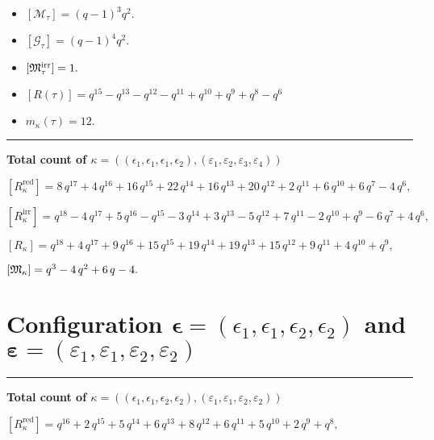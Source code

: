 \documentclass[10pt,a4paper]{amsart}
\begin{document}
\begin{itemize}
 \item $[\mathcal{M}_{\tau}] = {\left(q - 1\right)}^{3} q^{2} .$

 \item $[\mathcal{G}_{\tau}] = {\left(q - 1\right)}^{4} q^{2} .$

 \item $[{\frak M}_{\tau}^{\textrm{irr}}] = 1 .$

 \item $[R(\tau)] = q^{15} - q^{13} - q^{12} - q^{11} + q^{10} + q^{9} + q^{8} - q^{6} $

 \item $m_{\kappa}(\tau) = 12 .$

 \end{itemize}
\noindent\rule{9cm}{2pt}\vspace{0.2cm}

\noindent\textbf{Total count of $\kappa = ((\epsilon_1,\epsilon_1,\epsilon_1,\epsilon_2), (\varepsilon_1,\varepsilon_2,\varepsilon_3,\varepsilon_4))$}\medskip

${[R_{\kappa}^{\textrm{red}}]} = 8 \, q^{17} + 4 \, q^{16} + 16 \, q^{15} + 22 \, q^{14} + 16 \, q^{13} + 20 \, q^{12} + 2 \, q^{11} + 6 \, q^{10} + 6 \, q^{7} - 4 \, q^{6} ,$

${[R_{\kappa}^{\textrm{irr}}]} = q^{18} - 4 \, q^{17} + 5 \, q^{16} - q^{15} - 3 \, q^{14} + 3 \, q^{13} - 5 \, q^{12} + 7 \, q^{11} - 2 \, q^{10} + q^{9} - 6 \, q^{7} + 4 \, q^{6} ,$

${[R_{\kappa}]} = q^{18} + 4 \, q^{17} + 9 \, q^{16} + 15 \, q^{15} + 19 \, q^{14} + 19 \, q^{13} + 15 \, q^{12} + 9 \, q^{11} + 4 \, q^{10} + q^{9} ,$

${[{\frak M}_{\kappa}]} = q^{3} - 4 \, q^{2} + 6 \, q - 4 .$

\newpage{}

\section{Configuration $\bm{\epsilon} = (\epsilon_1,\epsilon_1,\epsilon_2,\epsilon_2)$ and $\bm{\varepsilon} =(\varepsilon_1,\varepsilon_1,\varepsilon_2,\varepsilon_2)$}
\noindent\rule{9cm}{2pt}\vspace{0.2cm}

\noindent\textbf{Total count of $\kappa = ((\epsilon_1,\epsilon_1,\epsilon_2,\epsilon_2), (\varepsilon_1,\varepsilon_1,\varepsilon_2,\varepsilon_2))$}\medskip

${[R_{\kappa}^{\textrm{red}}]} = q^{16} + 2 \, q^{15} + 5 \, q^{14} + 6 \, q^{13} + 8 \, q^{12} + 6 \, q^{11} + 5 \, q^{10} + 2 \, q^{9} + q^{8} ,$
\end{document}
